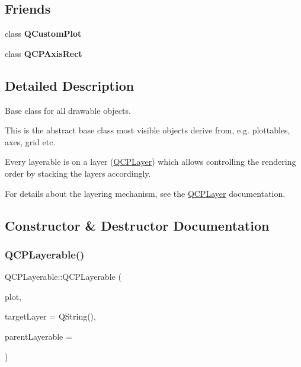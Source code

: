 \subsection*{Friends}
\begin{DoxyCompactItemize}
\item 
\hypertarget{class_q_c_p_layerable_a1cdf9df76adcfae45261690aa0ca2198}{}\label{class_q_c_p_layerable_a1cdf9df76adcfae45261690aa0ca2198} 
class {\bfseries Q\+Custom\+Plot}
\item 
\hypertarget{class_q_c_p_layerable_acbf20ecb140f66c5fd1bc64ae0762990}{}\label{class_q_c_p_layerable_acbf20ecb140f66c5fd1bc64ae0762990} 
class {\bfseries Q\+C\+P\+Axis\+Rect}
\end{DoxyCompactItemize}


\subsection{Detailed Description}
Base class for all drawable objects. 

This is the abstract base class most visible objects derive from, e.\+g. plottables, axes, grid etc.

Every layerable is on a layer (\hyperlink{class_q_c_p_layer}{Q\+C\+P\+Layer}) which allows controlling the rendering order by stacking the layers accordingly.

For details about the layering mechanism, see the \hyperlink{class_q_c_p_layer}{Q\+C\+P\+Layer} documentation. 

\subsection{Constructor \& Destructor Documentation}
\hypertarget{class_q_c_p_layerable_a74c0fa237f29bf0e49565013fc5d1ec0}{}\label{class_q_c_p_layerable_a74c0fa237f29bf0e49565013fc5d1ec0} 
\subsubsection{\texorpdfstring{Q\+C\+P\+Layerable()}{QCPLayerable()}}
{\footnotesize\ttfamily Q\+C\+P\+Layerable\+::\+Q\+C\+P\+Layerable (\begin{DoxyParamCaption}\item[{\hyperlink{class_q_custom_plot}{Q\+Custom\+Plot} $\ast$}]{plot,  }\item[{Q\+String}]{target\+Layer = {\ttfamily QString()},  }\item[{\hyperlink{class_q_c_p_layerable}{Q\+C\+P\+Layerable} $\ast$}]{parent\+Layerable = {} }\end{DoxyParamCaption})}

